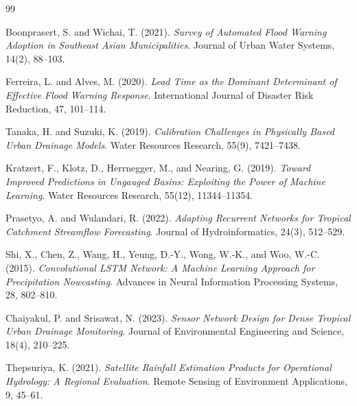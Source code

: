 \begin{thebibliography}{99}

Boonprasert, S. and Wichai, T. (2021). \textit{Survey of Automated Flood Warning Adoption in Southeast Asian Municipalities}. Journal of Urban Water Systems, 14(2), 88--103.

Ferreira, L. and Alves, M. (2020). \textit{Lead Time as the Dominant Determinant of Effective Flood Warning Response}. International Journal of Disaster Risk Reduction, 47, 101--114.

Tanaka, H. and Suzuki, K. (2019). \textit{Calibration Challenges in Physically Based Urban Drainage Models}. Water Resources Research, 55(9), 7421--7438.

Kratzert, F., Klotz, D., Herrnegger, M., and Nearing, G. (2019). \textit{Toward Improved Predictions in Ungauged Basins: Exploiting the Power of Machine Learning}. Water Resources Research, 55(12), 11344--11354.

Prasetyo, A. and Wulandari, R. (2022). \textit{Adapting Recurrent Networks for Tropical Catchment Streamflow Forecasting}. Journal of Hydroinformatics, 24(3), 512--529.

Shi, X., Chen, Z., Wang, H., Yeung, D.-Y., Wong, W.-K., and Woo, W.-C. (2015). \textit{Convolutional LSTM Network: A Machine Learning Approach for Precipitation Nowcasting}. Advances in Neural Information Processing Systems, 28, 802--810.

Chaiyakul, P. and Srisawat, N. (2023). \textit{Sensor Network Design for Dense Tropical Urban Drainage Monitoring}. Journal of Environmental Engineering and Science, 18(4), 210--225.

Thepsuriya, K. (2021). \textit{Satellite Rainfall Estimation Products for Operational Hydrology: A Regional Evaluation}. Remote Sensing of Environment Applications, 9, 45--61.

\end{thebibliography}

\appendix
